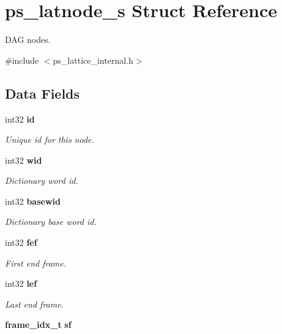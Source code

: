 \section{ps\+\_\+latnode\+\_\+s Struct Reference}
\label{structps__latnode__s}


D\+A\+G nodes.  




{\ttfamily \#include $<$ps\+\_\+lattice\+\_\+internal.\+h$>$}

\subsection*{Data Fields}
\begin{DoxyCompactItemize}
\item 
int32 {\bf id}\label{structps__latnode__s_a78243b37753f7a209c15d6adf98ee3f7}

\begin{DoxyCompactList}\small\item\em Unique id for this node. \end{DoxyCompactList}\item 
int32 {\bf wid}\label{structps__latnode__s_afd85dbd410d6e6d970c73088bc6fb97e}

\begin{DoxyCompactList}\small\item\em Dictionary word id. \end{DoxyCompactList}\item 
int32 {\bf basewid}\label{structps__latnode__s_ae3b3dc7d14347e6380859c74b9a02589}

\begin{DoxyCompactList}\small\item\em Dictionary base word id. \end{DoxyCompactList}\item 
int32 {\bf fef}\label{structps__latnode__s_a584ee5a303355d851ac903718998df14}

\begin{DoxyCompactList}\small\item\em First end frame. \end{DoxyCompactList}\item 
int32 {\bf lef}\label{structps__latnode__s_a5c7b9114d131151d6ce85228ea9f829d}

\begin{DoxyCompactList}\small\item\em Last end frame. \end{DoxyCompactList}\item 
{\bf frame\+\_\+idx\+\_\+t} {\bf sf}\label{structps__latnode__s_a4171e956043e7856c04d84498f16cf29}


\end{DoxyCompactItemize}
